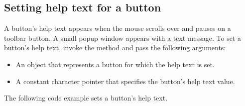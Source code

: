 \documentclass[letterpaper,12pt,english,openany,oneside]{sphinxmanual}
\begin{document}
\subsection{Setting help text for a button}
\label{\detokenize{Plugins_Toolbutton:setting-help-text-for-a-button}}
A button’s help text appears when the mouse scrolls over and pauses on a toolbar button. A small pop\sphinxhyphen{}up window appears with a text message. To set a button’s help text, invoke the  method and pass the following arguments:
\begin{itemize}
\item {} 
An  object that represents a button for which the help text is set.

\item {} 
A constant character pointer that specifies the button’s help text value.

\end{itemize}

The following code example sets a button’s help text.

\begin{sphinxVerbatim}[commandchars=\\\{\}]
   
      

   
       

   
        

  
         
     
\end{sphinxVerbatim}
\end{document}
